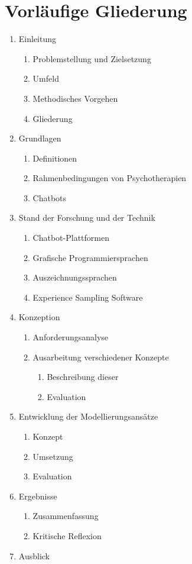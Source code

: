 
\section{Vorläufige Gliederung}
\label{ch:Gliederung}
\begin{enumerate} 
\item Einleitung
	\begin{enumerate}
	\item Problemstellung und Zielsetzung
	\item Umfeld
	\item Methodisches Vorgehen
	\item Gliederung
	\end{enumerate}
\item Grundlagen
	\begin{enumerate}
	\item Definitionen
	\item Rahmenbedingungen von Psychotherapien
	\item Chatbots
	\end{enumerate}
\item Stand der Forschung und der Technik
	\begin{enumerate}
	\item Chatbot-Plattformen
	\item Grafische Programmiersprachen
	\item Auszeichnungssprachen
	\item Experience Sampling Software
	\end{enumerate}
\item Konzeption
	\begin{enumerate}
	\item Anforderungsanalyse
	\item Ausarbeitung verschiedener Konzepte
		\begin{enumerate}
		\item Beschreibung dieser
		\item Evaluation
		\end{enumerate}
	\end{enumerate}
\item Entwicklung der Modellierungsansätze
	\begin{enumerate}
	\item Konzept
	\item Umsetzung
	\item Evaluation
	\end{enumerate}

\item Ergebnisse
	\begin{enumerate}
	\item Zusammenfassung
	\item Kritische Reflexion
	\end{enumerate}
\item Ausblick
\end{enumerate}

	